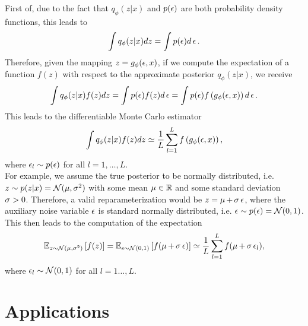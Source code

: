 First of, due to the fact that $q_{\phi} (z|x)$ and $p(\operatorname{\epsilon})$ are both probability density functions, this leads to
\begin{align*}
\int q_{\phi} (z|x) dz = \int p(\operatorname{\epsilon}) d\operatorname{\epsilon}.
\end{align*}
Therefore, given the mapping $z = g_{\phi}(\operatorname{\epsilon}, x)$, if we compute the expectation of a function $f(z)$ with respect to the approximate posterior $q_{\phi}(z|x)$, we receive
\begin{align*}
\int q_{\phi}(z|x) f(z) dz = \int p(\operatorname{\epsilon}) f(z) d\operatorname{\epsilon} = \int p(\operatorname{\epsilon}) f\left(g_{\phi}(\operatorname{\epsilon}, x) \right)d\operatorname{\epsilon}.
\end{align*}
This leads to the differentiable Monte Carlo estimator
\begin{align*}
\int q_{\phi}(z|x) f(z) dz \simeq \frac{1}{L} \sum_{l=1}^L f\left(g_{\phi} (\operatorname{\epsilon}, x)\right),
\end{align*}
where $\operatorname{\epsilon}_l\sim p(\operatorname{\epsilon})$ for all $l=1,\ldots, L$.\\
For example, we assume the true posterior to be normally distributed, i.e. $z\sim p(z|x)=\mathcal{N}(\operatorname{\mu}, \operatorname{\sigma}^2)$ with some mean $\operatorname{\mu}\in\operatorname{\mathbb{R}}$ and some standard deviation $\operatorname{\sigma}>0$. Therefore, a valid reparameterization would be $z = \operatorname{\mu} +\operatorname{\sigma}\operatorname{\epsilon}$, where the auxiliary noise variable $\operatorname{\epsilon}$ is standard normally distributed, i.e. $\operatorname{\epsilon}\sim p(\operatorname{\epsilon}) = \mathcal{N}(0,1)$. This then leads to the computation of the expectation
\begin{align*}
\operatorname{\mathbb{E}}_{z\sim \mathcal{N}(\operatorname{\mu}, \operatorname{\sigma}^2)} \left[ f(z) \right] = \operatorname{\mathbb{E}}_{\operatorname{\epsilon} \sim \mathcal{N}(0, 1)} \left[ f(\operatorname{\mu} + \operatorname{\sigma}\operatorname{\epsilon}) \right] \simeq \frac{1}{L} \sum_{l=1}^L f(\operatorname{\mu} + \operatorname{\sigma}\operatorname{\epsilon}_l),
\end{align*}
where $\operatorname{\epsilon}_l\sim \mathcal{N}(0, 1)$ for all $l=1\ldots, L$.

\section{Applications}\label{sec:vae_applications}

